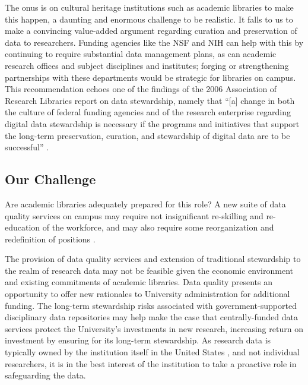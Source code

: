 \documentclass[man,12pt,biblatex]{apa6}
\begin{document}
The onus is on cultural heritage institutions such as academic
libraries to make this happen, a daunting and enormous challenge to be
realistic. It falls to us to make a convincing value-added argument
regarding curation and preservation of data to researchers. Funding
agencies like the NSF and NIH can help with this by continuing to
require substantial data management plans, as can academic research
offices and subject disciplines and institutes; forging or
strengthening partnerships with these departments would be strategic
for libraries on campus. This recommendation echoes one of the
findings of the 2006 Association of Research Libraries report on data
stewardship, namely that ``[a] change in both the culture of federal
funding agencies and of the research enterprise regarding digital data
stewardship is necessary if the programs and initiatives that support
the long-term preservation, curation, and stewardship of digital data
are to be successful'' \parencite{arl:stewardship}.

%

\subsection{Our Challenge}

Are academic libraries adequately prepared for this role?  A new suite
of data quality services on campus may require not insignificant
re-skilling and re-education of the workforce, and may also require
some reorganization and redefinition of positions \parencite{jisc:deluge}.

The provision of data quality services and extension of traditional
stewardship to the realm of research data may not be feasible given
the economic environment and existing commitments of academic
libraries. Data quality presents an opportunity to offer new
rationales to University administration for additional funding. The
long-term stewardship risks associated with government-supported
disciplinary data repositories \parencite{baker:funding,merali:peril}
may help make the case that centrally-funded data services protect the
University's investments in new research, increasing return on
investment by ensuring for its long-term stewardship. As research data
is typically owned by the institution itself in the United
States \parencite{dhhs:tutorial,dhhs:guidelines}, and not individual
researchers, it is in the best interest of the institution to take a
proactive role in safeguarding the data.
\end{document}

